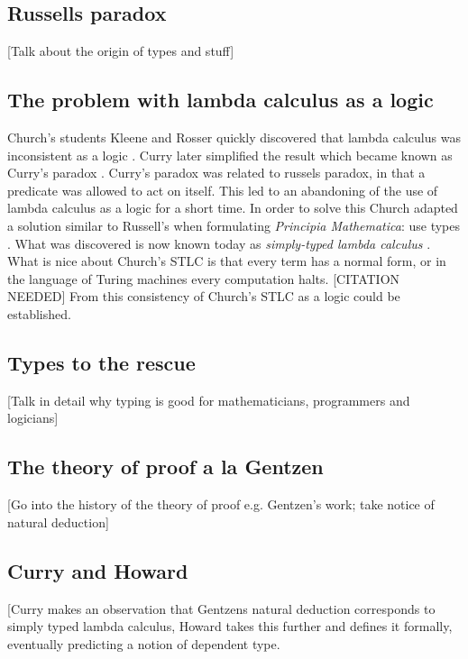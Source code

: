 \subsection{Russells paradox}

[Talk about the origin of types and stuff]

\subsection{The problem with lambda calculus as a logic}

Church's students Kleene and Rosser quickly discovered that lambda calculus was inconsistent as a logic \cite{kleene1935c}. Curry later simplified the result which became known as Curry's paradox \cite{curry1942}. Curry's paradox was related to russels paradox, in that a predicate was allowed to act on itself. This led to an abandoning of the use of lambda calculus as a logic for a short time. In order to solve this Church adapted a solution similar to Russell's when formulating \emph{Principia Mathematica}: use types \cite{PrincipiaMathematicaVolumeI}. What was discovered is now known today as \emph{simply-typed lambda calculus} \cite{church1940}. What is nice about Church's STLC is that every term has a normal form, or in the language of Turing machines every computation halts. \cite{turing1936a} [CITATION NEEDED] From this consistency of Church's STLC as a logic could be established.

\subsection{Types to the rescue}

[Talk in detail why typing is good for mathematicians, programmers and logicians]

\subsection{The theory of proof a la Gentzen}

[Go into the history of the theory of proof e.g. Gentzen's work; take notice of natural deduction]

\subsection{Curry and Howard}

[Curry makes an observation that Gentzens natural deduction corresponds to simply typed lambda calculus, Howard takes this further and defines it formally, eventually predicting a notion of dependent type.

